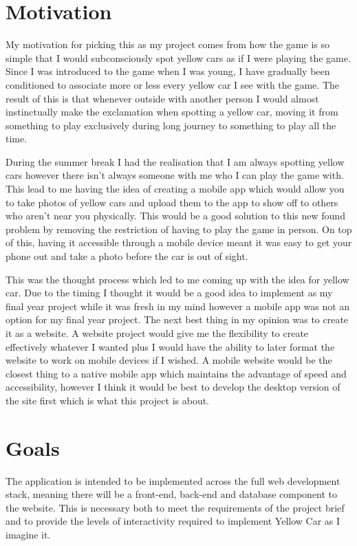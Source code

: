 \documentclass[]{final_report}
\begin{document}
\section{Motivation}

My motivation for picking this as my project comes from how the game is so simple that I would subconsciously spot yellow cars as if I were playing the game. Since I was introduced to the game when I was young, I have gradually been conditioned to associate more or less every yellow car I see with the game. The result of this is that whenever outside with another person I would almost instinctually make the exclamation when spotting a yellow car, moving it from something to play exclusively during long journey to something to play all the time.

During the summer break I had the realisation that I am always spotting yellow cars however there isn't always someone with me who I can play the game with. This lead to me having the idea of creating a mobile app which would allow you to take photos of yellow cars and upload them to the app to show off to others who aren't near you physically. This would be a good solution to this new found problem by removing the restriction of having to play the game in person. On top of this, having it accessible through a mobile device meant it was easy to get your phone out and take a photo before the car is out of sight.

This was the thought process which led to me coming up with the idea for yellow car. Due to the timing I thought it would be a good idea to implement as my final year project while it was fresh in my mind however a mobile app was not an option for my final year project. The next best thing in my opinion was to create it as a website. A website project would give me the flexibility to create effectively whatever I wanted plus I would have the ability to later format the website to work on mobile devices if I wished. A mobile website would be the closest thing to a native mobile app which maintains the advantage of speed and accessibility, however I think it would be best to develop the desktop version of the site first which is what this project is about.

\newpage
\section{Goals}

The application is intended to be implemented across the full web development stack, meaning there will be a front-end, back-end and database component to the website. This is necessary both to meet the requirements of the project brief and to provide the levels of interactivity required to implement Yellow Car as I imagine it.
\end{document}
